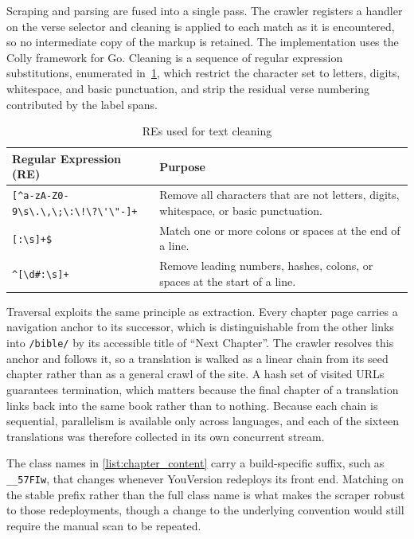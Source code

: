 \documentclass{article}
\begin{document}
Scraping and parsing are fused into a single pass. The crawler registers a
handler on the verse selector and cleaning is applied to each match as it is
encountered, so no intermediate copy of the markup is retained. The
implementation uses the Colly framework for Go. Cleaning is a sequence of
regular expression substitutions, enumerated in~\cref{tab:regex}, which
restrict the character set to letters, digits, whitespace, and basic
punctuation, and strip the residual verse numbering contributed by the label
spans.

\begin{table}[h!]
    \centering
    \begin{tabular}{p{} p{}}
        \hline
        \textbf{Regular Expression (RE)}        & \textbf{Purpose}                                                                      \\
        \hline
        \verb|[^a-zA-Z0-9\s\.\,\;\:\!\?\'\"-]+| & Remove all characters that are not letters, digits, whitespace, or basic punctuation. \\
        \verb|[:\s]+$|                          & Match one or more colons or spaces at the end of a line.                              \\
        \verb|^[\d#:\s]+|                       & Remove leading numbers, hashes, colons, or spaces at the start of a line.             \\
        \hline
    \end{tabular}
    \caption{REs used for text cleaning}\label{tab:regex}
\end{table}

Traversal exploits the same principle as extraction. Every chapter page carries
a navigation anchor to its successor, which is distinguishable from the other
links into \texttt{/bible/} by its accessible title of ``Next Chapter''. The
crawler resolves this anchor and follows it, so a translation is walked as a
linear chain from its seed chapter rather than as a general crawl of the site. A
hash set of visited URLs guarantees termination, which matters because the final
chapter of a translation links back into the same book rather than to nothing.
Because each chain is sequential, parallelism is available only across
languages, and each of the sixteen translations was therefore collected in its
own concurrent stream.

The class names in \cref{list:chapter_content} carry a build-specific suffix,
such as \texttt{\_\_57FIw}, that changes whenever YouVersion redeploys its front
end. Matching on the stable prefix rather than the full class name is what makes
the scraper robust to those redeployments, though a change to the underlying
convention would still require the manual scan to be repeated.
\end{document}
